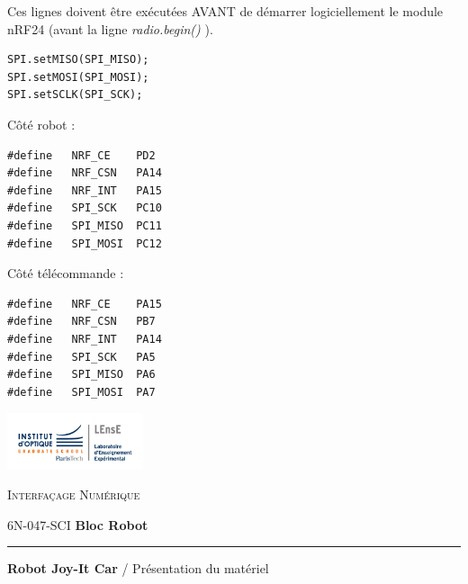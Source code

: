 \documentclass[a4paper,11pt,titlepage]{article} %
\begin{document}
Ces lignes doivent être exécutées AVANT de démarrer logiciellement le module nRF24 (avant la ligne \textsl{radio.begin()} ).

\begin{lstlisting}
SPI.setMISO(SPI_MISO);
SPI.setMOSI(SPI_MOSI);
SPI.setSCLK(SPI_SCK);
\end{lstlisting}


Côté robot : 

\begin{lstlisting}
#define   NRF_CE    PD2
#define   NRF_CSN   PA14
#define   NRF_INT   PA15
#define   SPI_SCK   PC10
#define   SPI_MISO  PC11
#define   SPI_MOSI  PC12
\end{lstlisting}


Côté télécommande : 

\begin{lstlisting}
#define   NRF_CE    PA15
#define   NRF_CSN   PB7
#define   NRF_INT   PA14
#define   SPI_SCK   PA5
#define   SPI_MISO  PA6
#define   SPI_MOSI  PA7
\end{lstlisting}

\newpage
\strut %

\newpage
\begin{minipage}[c]{.25\linewidth}
	\includegraphics[width=4cm]{images/Logo-LEnsE.png}
\end{minipage} \hfill
\begin{minipage}[c]{.4\linewidth}

\begin{center}
\vspace{0.3cm}
{\Large \textsc{Interfaçage Numérique}}

\medskip

6N-047-SCI \qquad \textbf{\Large Bloc Robot}

\end{center}
\end{minipage}\hfill

\vspace{0.5cm}

\noindent \rule{\linewidth}{1pt}

{\noindent\Large \rule[-7pt]{0pt}{30pt} \textbf{Robot Joy-It Car} / Présentation du matériel}
\end{document}
